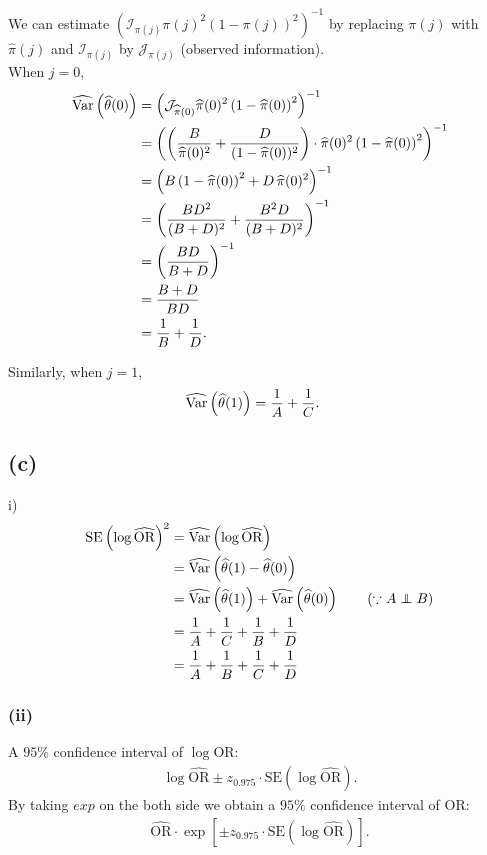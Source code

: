 We can estimate $\left(\mathcal{I}_{\pi(j)}\pi(j)^{2}\left(1-\pi(j)\right)^{2}\right)^{-1}$ by replacing $\pi(j)$ with $\widehat{\pi}(j)$ and $\mathcal{I}_{\pi(j)}$ by $\mathcal{J}_{\pi(j)}$ (observed information).\\

When $j = 0$,
\begin{align*}
\widehat{\mathrm{Var}}\left(\widehat{\theta}(0)\right) &= \left(\mathcal{J}_{\widehat{\pi}(0)}\widehat{\pi}(0)^{2}\left(1-\widehat{\pi}(0)\right)^{2}\right)^{-1}\\
&= \left(\left(\frac{B}{\widehat{\pi}(0)^{2}} + \frac{D}{(1-\widehat{\pi}(0))^{2}}\right)\cdot \widehat{\pi}(0)^{2}\left(1-\widehat{\pi}(0)\right)^{2} \right)^{-1}\\
&= \left(B\left(1-\widehat{\pi}(0)\right)^{2} + D \, \widehat{\pi}(0)^{2}\right)^{-1}\\
&= \left(\frac{BD^{2}}{(B+D)^{2}} + \frac{B^{2}D}{(B+D)^{2}}\right)^{-1}\\
&= \left(\frac{BD}{B+D}\right)^{-1}\\
&= \frac{B+D}{BD}\\
&= \frac{1}{B} + \frac{1}{D}.
\end{align*}

Similarly, when $j = 1$,
\begin{align*}
\widehat{\mathrm{Var}}\left(\widehat{\theta}(1)\right) &= \frac{1}{A} + \frac{1}{C}.
\end{align*}

\vspace{\baselineskip}
\subsection*{(c)}

i)
\begin{align*}
\mathrm{SE}\left(\log\widehat{\mathrm{OR}}\right)^{2} &= \widehat{\Var}\left(\log\widehat{\mathrm{OR}}\right)\\
&= \widehat{\Var}\left(\widehat{\theta}(1) - \widehat{\theta}(0)\right)\\
&= \widehat{\Var}\left(\widehat{\theta}(1)\right) + \widehat{\Var}\left(\widehat{\theta}(0)\right) \tag{$\because A \independent B$}\\
&= \frac{1}{A} + \frac{1}{C} + \frac{1}{B} + \frac{1}{D}\\
&= \frac{1}{A} + \frac{1}{B} + \frac{1}{C} + \frac{1}{D}\\
\end{align*}

\subsubsection*{(ii)}
A $95\%$ confidence interval of $\log\mathrm{OR}$:
\begin{align*}
\log\widehat{\mathrm{OR}} \pm z_{0.975}\cdot\mathrm{SE}\left(\log\widehat{\mathrm{OR}}\right).
\end{align*}
By taking $exp$ on the both side we obtain a $95\%$ confidence interval of $\mathrm{OR}$:
\begin{align*}
\widehat{\mathrm{OR}} \cdot \exp\left[\pm z_{0.975}\cdot\mathrm{SE}\left(\log\widehat{\mathrm{OR}}\right)\right].
\end{align*}

